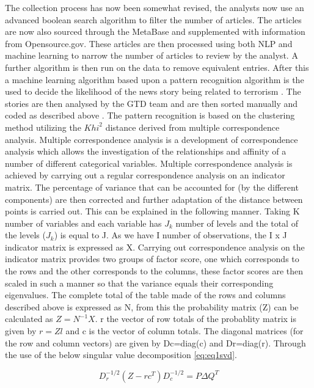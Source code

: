 The collection process has now been somewhat revised, the analysts now use an advanced boolean search algorithm to filter the number of articles. The articles are now also sourced through the MetaBase and supplemented with information from Opensource.gov. These articles are then processed using both NLP and machine learning to narrow the number of articles to review by the analyst. A further algorithm is then run on the data to remove equivalent entries. After this a machine learning algorithm  based upon a pattern recognition algorithm is the used to decide the likelihood of the news story being related to terrorism \citep{fivethirtyeightGTD2015}. The stories are then analysed by the GTD team and are then sorted manually and coded as described above \citep{ben2016pattern}. The pattern recognition is based on the clustering method utilizing the ${Khi}^2$ distance derived from multiple correspondence analysis. Multiple correspondence analysis is a development of correspondence analysis which allows the investigation of the relationships and affinity of a number of different categorical variables. Multiple correspondence analysis is achieved by carrying out a regular correspondence analysis on an indicator matrix. The percentage of variance that can be accounted for (by the different components) are then corrected and further adaptation of the distance between points is carried out. This can be explained in the following manner. Taking K number of variables and each variable has $J_{k}$ number of levels and the total of the levels ($J_{k}$) is equal to J. As we have I number of  observations, the I x J indicator matrix is expressed as X. Carrying out correspondence analysis on the indicator matrix provides two groups of factor score, one which corresponds to the rows and the other corresponds to the columns, these factor scores are then scaled in such a manner so that the variance equals their corresponding eigenvalues. The complete total of the table made of the rows and columns described above is expressed as N, from this the probability matrix (Z) can be calculated as  $Z = N^{-1}X$. r the vector of row totals of the probablity matrix is given by $r=Zl$ and c is the vector of column totals. The diagonal  matrices (for the row and column vectors) are given by Dc=diag(c) and Dr=diag(r). Through the use of the below singular value decomposition \ref{eq:eq1svd}. 

\begin{equation} D_{r}^{-1/2}(Z-rc^{T})D_{c}^{-1/2}=P\Delta Q^{T}  \label{eq:eq1svd} \end{equation}

